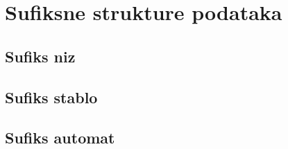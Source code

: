 \section{Sufiksne strukture podataka}

\subsection{Sufiks niz}

\subsection{Sufiks stablo}

\subsection{Sufiks automat}
